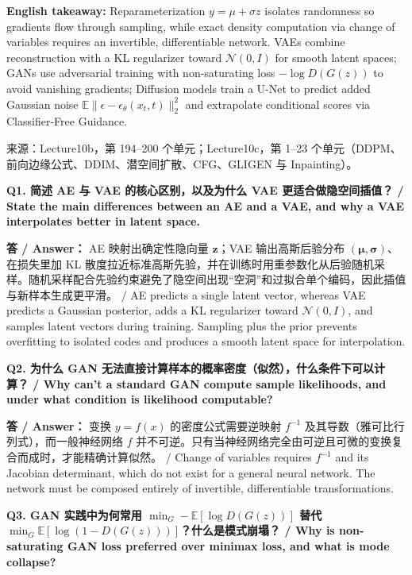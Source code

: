 \textbf{English takeaway:} Reparameterization $y=\mu+\sigma z$ isolates randomness so gradients flow through sampling, while exact density computation via change of variables requires an invertible, differentiable network. VAEs combine reconstruction with a KL regularizer toward $\mathcal{N}(0,I)$ for smooth latent spaces; GANs use adversarial training with non-saturating loss $-\log D(G(z))$ to avoid vanishing gradients; Diffusion models train a U-Net to predict added Gaussian noise $\mathbb{E}\|\epsilon-\epsilon_\theta(x_t,t)\|_2^2$ and extrapolate conditional scores via Classifier-Free Guidance.

来源：Lecture10b，第 194–200 个单元；Lecture10c，第 1–23 个单元（DDPM、前向边缘公式、DDIM、潜空间扩散、CFG、GLIGEN 与 Inpainting）。



\textbf{Q1. 简述 AE 与 VAE 的核心区别，以及为什么 VAE 更适合做隐空间插值？ / State the main differences between an AE and a VAE, and why a VAE interpolates better in latent space.}

\textbf{答 / Answer：} AE 映射出确定性隐向量 $\mathbf{z}$；VAE 输出高斯后验分布 $(\boldsymbol{\mu},\boldsymbol{\sigma})$、在损失里加 KL 散度拉近标准高斯先验，并在训练时用重参数化从后验随机采样。随机采样配合先验约束避免了隐空间出现“空洞”和过拟合单个编码，因此插值与新样本生成更平滑。 / AE predicts a single latent vector, whereas VAE predicts a Gaussian posterior, adds a KL regularizer toward $\mathcal{N}(0,I)$, and samples latent vectors during training. Sampling plus the prior prevents overfitting to isolated codes and produces a smooth latent space for interpolation.

\textbf{Q2. 为什么 GAN 无法直接计算样本的概率密度（似然），什么条件下可以计算？ / Why can't a standard GAN compute sample likelihoods, and under what condition is likelihood computable?}

\textbf{答 / Answer：} 变换 $y=f(x)$ 的密度公式需要逆映射 $f^{-1}$ 及其导数（雅可比行列式），而一般神经网络 $f$ 并不可逆。只有当神经网络完全由可逆且可微的变换复合而成时，才能精确计算似然。 / Change of variables requires $f^{-1}$ and its Jacobian determinant, which do not exist for a general neural network. The network must be composed entirely of invertible, differentiable transformations.

\textbf{Q3. GAN 实践中为何常用 $\min_G -\mathbb{E}[\log D(G(z))]$ 替代 $\min_G \mathbb{E}[\log(1-D(G(z)))]$？什么是模式崩塌？ / Why is non-saturating GAN loss preferred over minimax loss, and what is mode collapse?}

